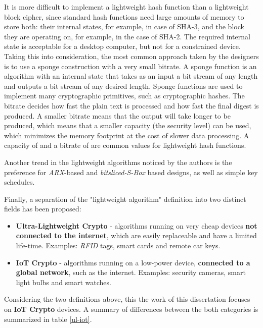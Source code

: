 \documentclass{llncs}
\begin{document}
It is more difficult to implement a lightweight hash function than a lightweight
block cipher, since standard hash functions need large amounts
of memory to store both: their internal states, for example,  in case of SHA-3,
and the block they are operating on, for example,  in the case of SHA-2.
The required internal state is acceptable for a desktop computer, but not for a
constrained device. Taking this into consideration, the most common approach
taken by the designers is to use a sponge construction with a very small bitrate.
A sponge function is an algorithm with an internal state that takes as an input
a bit stream of any length and outputs a bit stream of any desired length. Sponge
functions are used to implement many cryptographic primitives, such as cryptographic
hashes. The bitrate decides how fast the plain text is processed and how fast the
final digest is produced. A smaller bitrate means that the output will take longer
to be produced, which means that a smaller capacity (the security level)
can be used, which minimizes the memory footprint at the cost of slower data
processing. A capacity of  and a bitrate of 
are common values for lightweight hash functions.

Another trend in the lightweight algorithms noticed by the authors is the
preference for \textit{ARX}-based and \textit{bitsliced-S-Box} based designs, as well as simple key schedules.

Finally, a separation of the "lightweight algorithm" definition into two distinct fields has been proposed:

\begin{itemize}
  \item \textbf{Ultra-Lightweight Crypto} - algorithms running on very cheap
  devices \textbf{not connected to the internet}, which are easily replaceable
  and have a limited life-time. Examples: \textit{RFID} tags, smart cards and remote car keys.
  \item \textbf{IoT Crypto} - algorithms running on a low-power device,
  \textbf{connected to a global network}, such as the internet. Examples: security cameras, smart light bulbs and smart watches.
\end{itemize}

Considering the two definitions above, this the work of this dissertation focuses on \textbf{IoT Crypto}
devices. A summary of differences between the both categories is summarized in
table \ref{ul-iot}.
\end{document}
